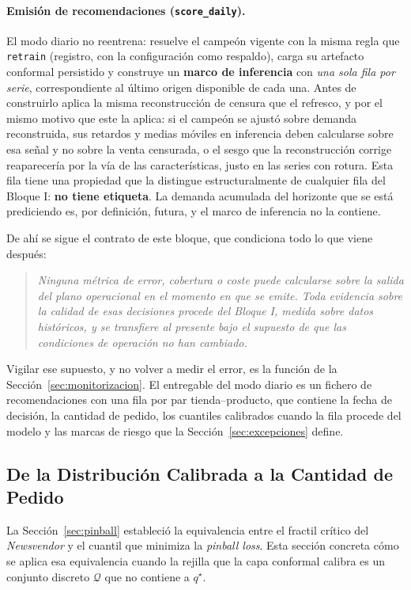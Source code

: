 \paragraph{Emisión de recomendaciones (\texttt{score\_daily}).} El modo diario no reentrena: resuelve el campeón vigente con la misma regla que \texttt{retrain} (registro, con la configuración como respaldo), carga su artefacto conformal persistido y construye un \textbf{marco de inferencia} con \emph{una sola fila por serie}, correspondiente al último origen disponible de cada una. Antes de construirlo aplica la misma reconstrucción de censura que el refresco, y por el mismo motivo que este la aplica: si el campeón se ajustó sobre demanda reconstruida, sus retardos y medias móviles en inferencia deben calcularse sobre esa señal y no sobre la venta censurada, o el sesgo que la reconstrucción corrige reaparecería por la vía de las características, justo en las series con rotura. Esta fila tiene una propiedad que la distingue estructuralmente de cualquier fila del Bloque I: \textbf{no tiene etiqueta}. La demanda acumulada del horizonte que se está prediciendo es, por definición, futura, y el marco de inferencia no la contiene.

De ahí se sigue el contrato de este bloque, que condiciona todo lo que viene después:

\begin{quote}
\textit{Ninguna métrica de error, cobertura o coste puede calcularse sobre la salida del plano operacional en el momento en que se emite. Toda evidencia sobre la calidad de esas decisiones procede del Bloque I, medida sobre datos históricos, y se transfiere al presente bajo el supuesto de que las condiciones de operación no han cambiado.}
\end{quote}

Vigilar ese supuesto, y no volver a medir el error, es la función de la Sección~\ref{sec:monitorizacion}. El entregable del modo diario es un fichero de recomendaciones con una fila por par tienda--producto, que contiene la fecha de decisión, la cantidad de pedido, los cuantiles calibrados cuando la fila procede del modelo y las marcas de riesgo que la Sección~\ref{sec:excepciones} define.

\subsection{De la Distribución Calibrada a la Cantidad de Pedido}
\label{sec:newsvendor_operativo}

La Sección~\ref{sec:pinball} estableció la equivalencia entre el fractil crítico del \textit{Newsvendor} y el cuantil que minimiza la \textit{pinball loss}. Esta sección concreta cómo se aplica esa equivalencia cuando la rejilla que la capa conformal calibra es un conjunto discreto $\mathcal{Q}$ que no contiene a $q^\star$.

